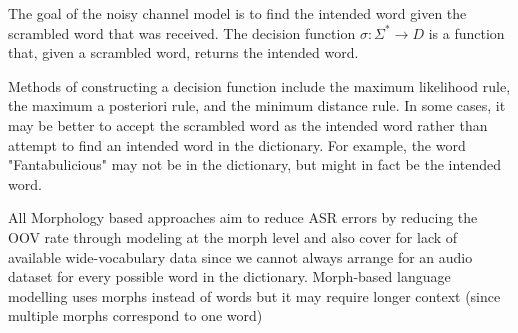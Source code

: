 
The goal of the noisy channel model is to find the intended word given the scrambled word that was received. The decision function $\sigma:\Sigma^* \rightarrow D$ is a function that, given a scrambled word, returns the intended word.

Methods of constructing a decision function include the maximum likelihood rule, the maximum a posteriori rule, and the minimum distance rule. In some cases, it may be better to accept the scrambled word as the intended word rather than attempt to find an intended word in the dictionary. For example, the word "Fantabulicious" may not be in the dictionary, but might in fact be the intended word.  

All Morphology based approaches aim to reduce ASR errors by reducing the OOV rate through modeling at the morph level and also cover for lack of available wide-vocabulary data since we cannot always arrange for an audio dataset for every possible word in the dictionary. Morph-based language modelling uses morphs instead of words but it may require longer context (since multiple morphs correspond to one word) \cite{creutz_morph-based_2007}